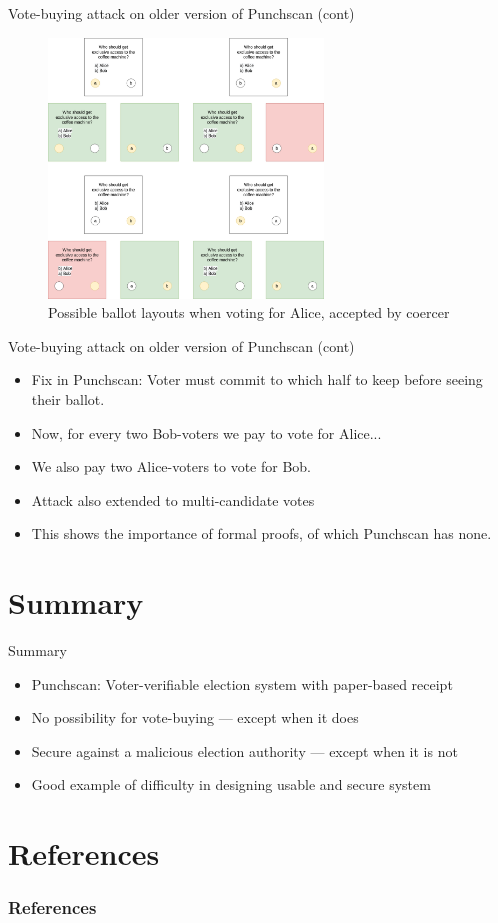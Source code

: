 \documentclass{beamer}
\begin{document}
\begin{frame}{Vote-buying attack on older version of Punchscan (cont)}
	\begin{figure}
		\centering
		\includegraphics[width=0.65\textwidth]{../resources/vote_buying_split_highlighted_alice.drawio.png}
		\caption{Possible ballot layouts when voting for Alice, accepted by coercer}
	\end{figure}
\end{frame}

\begin{frame}{Vote-buying attack on older version of Punchscan (cont)}
	\begin{itemize}
		\item Fix in Punchscan: Voter must commit to which half to keep before seeing their ballot.
		\item Now, for every two Bob-voters we pay to vote for Alice...
		\item We also pay two Alice-voters to vote for Bob.
		\item Attack also extended to multi-candidate votes\autocite{kelseyAttackingPaperBasedE2E2010}
		\item This shows the importance of formal proofs, of which Punchscan has none.
	\end{itemize}
\end{frame}

\section{Summary}

\begin{frame}{Summary}
	\begin{itemize}
		\item Punchscan: Voter-verifiable election system with paper-based receipt
		\item No possibility for vote-buying --- except when it does
		\item Secure against a malicious election authority --- except when it is not
		\item Good example of difficulty in designing usable and
			secure system
	\end{itemize}
\end{frame}

\section{References}

\begin{frame}[allowframebreaks]
	\frametitle{References}
	\printbibliography
\end{frame}
\end{document}
